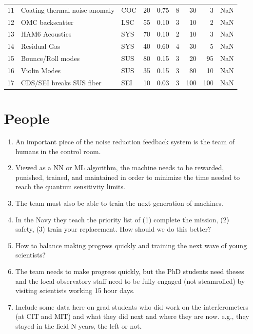 \begin{tabular}{lllrrrrrr}
11 &        Coating thermal noise anomaly &        COC &               20 &              0.75 &                8 &                    30 &                     3 &             NaN \\
12 &                      OMC backscatter &        LSC &               55 &              0.10 &                3 &                    10 &                     2 &             NaN \\
13 &                       HAM6 Acoustics &        SYS &               70 &              0.10 &                2 &                    10 &                     3 &             NaN \\
14 &                         Residual Gas &        SYS &               40 &              0.60 &                4 &                    30 &                     5 &             NaN \\
15 &                    Bounce/Roll modes &        SUS &               80 &              0.15 &                3 &                    20 &                    95 &             NaN \\
16 &                         Violin Modes &        SUS &               35 &              0.15 &                3 &                    80 &                    10 &             NaN \\
17 &             CDS/SEI breaks SUS fiber &        SEI &               10 &              0.03 &                3 &                   100 &                   100 &             NaN \\
\end{tabular}

\section{People}
\begin{enumerate}
\item An important piece of the noise reduction feedback system 
  is the team of humans in the control room.
\item Viewed as a NN or ML algorithm, the machine needs to be 
  rewarded, punished, trained, and maintained in order to minimize 
  the time needed to reach the quantum sensitivity limits.
\item The team must also be able to train the next generation of machines.
\item In the Navy they teach the priority list of (1) complete the mission, 
  (2) safety, (3) train your replacement. How should we do this better?
\item How to balance making progress quickly and training the next 
  wave of young scientists?
\item The team needs to make progress quickly, but the PhD 
  students need theses and the local observatory staff need to 
  be fully engaged (not steamrolled) by visiting scientists 
  working 15 hour days.
\item Include some data here on grad students who did work on the
  interferometers (at CIT and MIT) and what they did next and where
  they are now. e.g., they stayed in the field N years, the left or not.
\end{enumerate}

